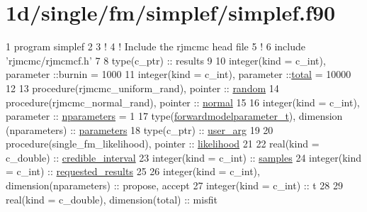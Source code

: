 \hypertarget{1d_2single_2fm_2simplef_2simplef_8f90-example}{}\section{1d/single/fm/simplef/simplef.\+f90}

\begin{DoxyCodeInclude}
1 \textcolor{keyword}{program} simplef
2 
3 \textcolor{comment}{!}
4 \textcolor{comment}{! Include the rjmcmc head file}
5 \textcolor{comment}{!}
6 include \textcolor{stringliteral}{'rjmcmc/rjmcmcf.h'}
7 
8 \textcolor{keywordtype}{type}(c\_ptr) :: results
9 
10 \textcolor{keywordtype}{integer(kind = c\_int)}, \textcolor{keywordtype}{parameter} ::burnin = 1000
11 \textcolor{keywordtype}{integer(kind = c\_int)}, \textcolor{keywordtype}{parameter} ::\hyperlink{rjmcmcf__mpi_8h_a1829e955eab35ef63200105c2de1ad94}{total} = 10000
12 
13 \textcolor{keywordtype}{procedure}(rjmcmc\_uniform\_rand), \textcolor{keywordtype}{pointer} :: \hyperlink{rjmcmcf__mpi_8h_a361f30102277b1d490d4edc190afccf6}{random}
14 \textcolor{keywordtype}{procedure}(rjmcmc\_normal\_rand), \textcolor{keywordtype}{pointer} :: \hyperlink{rjmcmcf__mpi_8h_a6304ff7c79f9217c47a3373e460e3cfc}{normal}
15 
16 \textcolor{keywordtype}{integer(kind = c\_int)}, \textcolor{keywordtype}{parameter} :: \hyperlink{rjmcmcf__mpi_8h_ad1c48db951dfa8787a94c0c56ae60e13}{nparameters} = 1
17 \textcolor{keywordtype}{type}(\hyperlink{forwardmodelparameter_8h_a18a7d2fd51fab097145725d83ac328e3}{forwardmodelparameter\_t}), \textcolor{keywordtype}{dimension (nparameters)} :: 
      \hyperlink{rjmcmcf__mpi_8h_af69ab156c03e104279d5e0cb70a0d4c4}{parameters}
18 \textcolor{keywordtype}{type}(c\_ptr) :: \hyperlink{rjmcmcf__mpi_8h_ab68b3a27bfe943a73cf680c2e439e070}{user\_arg}
19 
20 \textcolor{keywordtype}{procedure}(single\_fm\_likelihood), \textcolor{keywordtype}{pointer} :: \hyperlink{rjmcmcf__mpi_8h_a1f8ef761c1c5dea3f15f637135c162db}{likelihood}
21 
22 \textcolor{keywordtype}{real(kind = c\_double)} :: \hyperlink{rjmcmcf__mpi_8h_a5a7722a5cc210713ec1b3956fde06e70}{credible\_interval}
23 \textcolor{keywordtype}{integer(kind = c\_int)} :: \hyperlink{rjmcmcf__mpi_8h_a30e374d8d017c0854f714c208aea6512}{samples}
24 \textcolor{keywordtype}{integer(kind = c\_int)} :: \hyperlink{rjmcmcf__mpi_8h_a141ddf12f08f2f9e95036a6cd06324ff}{requested\_results}
25 
26 \textcolor{keywordtype}{integer(kind = c\_int)}, \textcolor{keywordtype}{dimension(nparameters)} :: propose, accept
27 \textcolor{keywordtype}{integer(kind = c\_int)} :: t
28 
29 \textcolor{keywordtype}{real(kind = c\_double)}, \textcolor{keywordtype}{dimension(total)} :: misfit

\end{DoxyCodeInclude}
